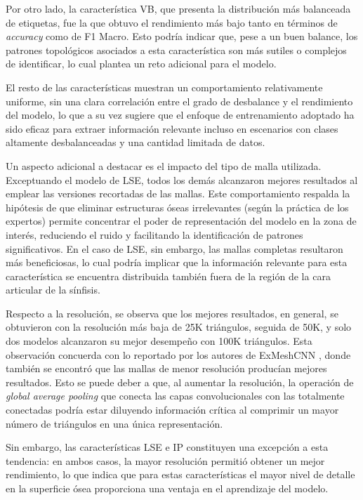 Por otro lado, la característica VB, que presenta la distribución más balanceada de etiquetas, fue la que obtuvo el rendimiento más bajo tanto en términos de \textit{accuracy} como de F1 Macro. Esto podría indicar que, pese a un buen balance, los patrones topológicos asociados a esta característica son más sutiles o complejos de identificar, lo cual plantea un reto adicional para el modelo.

El resto de las características muestran un comportamiento relativamente uniforme, sin una clara correlación entre el grado de desbalance y el rendimiento del modelo, lo que a su vez sugiere que el enfoque de entrenamiento adoptado ha sido eficaz para extraer información relevante incluso en escenarios con clases altamente desbalanceadas y una cantidad limitada de datos.

Un aspecto adicional a destacar es el impacto del tipo de malla utilizada. Exceptuando el modelo de LSE, todos los demás alcanzaron mejores resultados al emplear las versiones recortadas de las mallas. Este comportamiento respalda la hipótesis de que eliminar estructuras óseas irrelevantes (según la práctica de los expertos) permite concentrar el poder de representación del modelo en la zona de interés, reduciendo el ruido y facilitando la identificación de patrones significativos. En el caso de LSE, sin embargo, las mallas completas resultaron más beneficiosas, lo cual podría implicar que la información relevante para esta característica se encuentra distribuida también fuera de la región de la cara articular de la sínfisis.

Respecto a la resolución, se observa que los mejores resultados, en general, se obtuvieron con la resolución más baja de 25K triángulos, seguida de 50K, y solo dos modelos alcanzaron su mejor desempeño con 100K triángulos. Esta observación concuerda con lo reportado por los autores de ExMeshCNN \cite{kim_exmeshcnn_2022}, donde también se encontró que las mallas de menor resolución producían mejores resultados. Esto se puede deber a que, al aumentar la resolución, la operación de \textit{global average pooling} que conecta las capas convolucionales con las totalmente conectadas podría estar diluyendo información crítica al comprimir un mayor número de triángulos en una única representación.

Sin embargo, las características LSE e IP constituyen una excepción a esta tendencia: en ambos casos, la mayor resolución permitió obtener un mejor rendimiento, lo que indica que para estas características el mayor nivel de detalle en la superficie ósea proporciona una ventaja en el aprendizaje del modelo.

